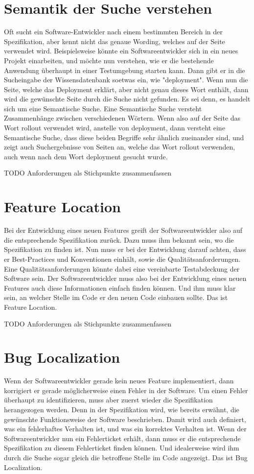 \section{Semantik der Suche verstehen}
Oft sucht ein Software-Entwickler nach einem bestimmten Bereich in der Spezifikation, aber kennt nicht das genaue Wording, welches auf der Seite verwendet wird.
Beispielsweise könnte ein Softwareentwickler sich in ein neues Projekt einarbeiten, und möchte nun verstehen, wie er die bestehende Anwendung überhaupt in einer Testumgebung starten kann.
Dann gibt er in die Sucheingabe der Wissensdatenbank soetwas ein, wie "deployment".
Wenn nun die Seite, welche das Deployment erklärt, aber nicht genau dieses Wort enthält, dann wird die gewünschte Seite durch die Suche nicht gefunden.
Es sei denn, es handelt sich um eine Semantische Suche.
Eine Semantische Suche versteht Zusammenhänge zwischen verschiedenen Wörtern.
Wenn also auf der Seite das Wort rollout verwendet wird, anstelle von deployment, dann versteht eine Semantische Suche, dass diese beiden Begriffe sehr ähnlich zueinander sind, und zeigt auch Suchergebnisse von Seiten an, welche das Wort rollout verwenden, auch wenn nach dem Wort deployment gesucht wurde.

TODO Anforderungen als Stichpunkte zusammenfassen

\section{Feature Location}
Bei der Entwicklung eines neuen Features greift der Softwareentwickler also auf die entsprechende Spezifikation zurück.
Dazu muss ihm bekannt sein, wo die Spezifikation zu finden ist.
Nun muss er bei der Entwicklung darauf achten, dass er Best-Practices und Konventionen einhält, sowie die Qualitätsanforderungen.
Eine Qualitätsanforderungen könnte dabei eine vereinbarte Testabdeckung der Software sein.
Der Softwareentwickler muss also bei der Entwicklung eines neuen Features auch diese Informationen einfach finden können.
Und ihm muss klar sein, an welcher Stelle im Code er den neuen Code einbauen sollte.
Das ist Feature Location.

TODO Anforderungen als Stichpunkte zusammenfassen

\section{Bug Localization}
Wenn der Softwareentwickler gerade kein neues Feature implementiert, dann korrigiert er gerade möglicherweise einen Fehler in der Software.
Um einen Fehler überhaupt zu identifizieren, muss aber zuerst wieder die Spezifikation herangezogen werden.
Denn in der Spezifikation wird, wie bereits erwähnt, die gewünschte Funktionsweise der Software beschrieben.
Damit wird auch definiert, was ein fehlerhaftes Verhalten ist, und was ein korrektes Verhalten ist.
Wenn der Softwareentwickler nun ein Fehlerticket erhält, dann muss er die entsprechende Spezifikation zu diesem Fehlerticket finden können.
Und idealerweise wird ihm durch die Suche sogar gleich die betroffene Stelle im Code angezeigt.
Das ist Bug Localization.\\

